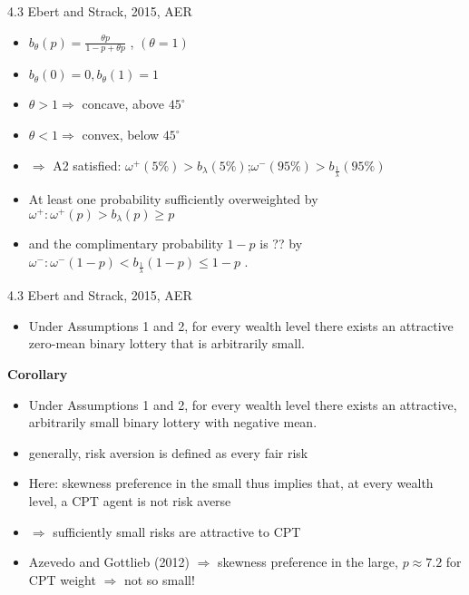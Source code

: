 \documentclass[11pt,aspectratio=169]{beamer}
\begin{document}
\begin{frame}{4.3 Ebert and Strack, 2015, AER}
    \begin{itemize}
        \item $b_\theta (p)=\frac{\theta p}{1-p+\theta p} $ , $ (\theta=1)$ \medskip
        \item $b_\theta(0)=0, b_\theta(1)=1$\medskip
        \item $\theta>1 \Rightarrow$ concave, above $45^{ \circ}$\medskip
        \item $\theta<1 \Rightarrow$ convex, below $45^{ \circ}$\medskip
        \item $\Rightarrow$ A2 satisfied: $\omega ^{+}(5\%)> b_\lambda(5\%) $;\quad $ \omega ^{-}(95\%)> b_\frac{1}{\lambda}(95\%) $\medskip
        \item At least one probability sufficiently overweighted by $\omega^+ : \omega^+(p)>b_{\lambda}(p) \geq p$\medskip
        \item and the complimentary probability $1-p$ is ?? by $\omega^- :\omega^-(1-p) < b_{\frac{1}{\lambda}}(1-p) \leq 1-p$ .\medskip
	\end{itemize}
\end{frame}
\begin{frame}{4.3 Ebert and Strack, 2015, AER}
 
    \begin{itemize}
        \item Under Assumptions 1 and 2, for every wealth level there exists an attractive zero-mean binary lottery that is arbitrarily small. \medskip
	\end{itemize}

    \textbf{Corollary}\\
    \begin{itemize}
        \item  Under Assumptions 1 and 2, for every wealth level there exists an attractive, arbitrarily small binary lottery with negative mean.\medskip
	\end{itemize}
    \begin{itemize}
        \item generally, risk aversion is defined as every fair risk\medskip
        \item Here: skewness preference in the small thus implies that, at every wealth level, a CPT agent is not risk averse\medskip
        \item $\Rightarrow $  sufficiently small risks are attractive to CPT\medskip
        \item   Azevedo and Gottlieb (2012) $\Rightarrow$ skewness preference in the large, $p\approx 7.2$ for CPT weight $\Rightarrow$ not so small!\medskip
	\end{itemize}
\end{frame}
\end{document}
